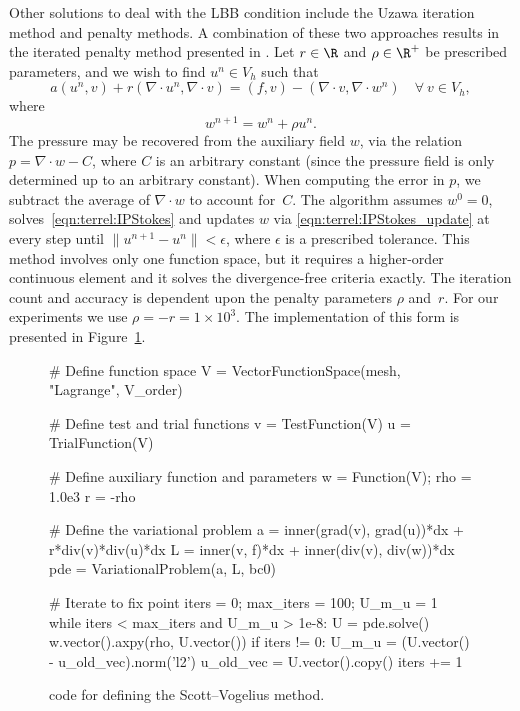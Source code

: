 Other solutions to deal with the LBB condition include the Uzawa
iteration method and penalty methods.  A combination of these two
approaches results in the iterated penalty method presented in
\citet{ScottVogelius1985}. Let $r \in \R$ and $\rho \in \R^{+}$ be
prescribed parameters, and we wish to find $u^n \in V_{h}$ such that
\begin{equation}
\label{eqn:terrel:IPStokes}
 a(u^n, v) + r(\nabla \cdot u^n, \nabla \cdot v)
      =  (f, v) - (\nabla\cdot v, \nabla \cdot w^n) \quad \forall \ v \in V_{h},
\end{equation}
%
where
%
\begin{equation}
\label{eqn:terrel:IPStokes_update}
   w^{n+1} = w^n + \rho u^n.
\end{equation}
%
The pressure may be recovered from the auxiliary field $w$, via
the relation $p = \nabla\cdot w - C$, where $C$ is an arbitrary
constant (since the pressure field is only determined up to an
arbitrary constant).  When computing the error in $p$, we subtract
the average of $\nabla \cdot w$ to account for~$C$. The algorithm
assumes $w^0 = 0$, solves~\eqref{eqn:terrel:IPStokes} and updates $w$
via \eqref{eqn:terrel:IPStokes_update} at every step until $\|u^{n+1} -
u^{n}\| < \epsilon$, where $\epsilon$ is a prescribed tolerance. This
method involves only one function space, but it requires a higher-order
continuous element and it solves the divergence-free criteria exactly.
The iteration count and accuracy is dependent upon the penalty
parameters $\rho$ and~$r$.  For our experiments we use $\rho = -r =
1 \times 10^{3}$.  The implementation of this form is presented in
Figure~\ref{code:terrel:var:ip}.
%
\begin{figure}
\begin{python}
# Define function space
V = VectorFunctionSpace(mesh, "Lagrange", V_order)

# Define test and trial functions
v = TestFunction(V)
u = TrialFunction(V)

# Define auxiliary function and parameters
w = Function(V);
rho = 1.0e3
r = -rho

# Define the variational problem
a = inner(grad(v), grad(u))*dx + r*div(v)*div(u)*dx
L = inner(v, f)*dx + inner(div(v), div(w))*dx
pde = VariationalProblem(a, L, bc0)

# Iterate to fix point
iters = 0; max_iters = 100; U_m_u = 1
while iters < max_iters and U_m_u > 1e-8:
    U = pde.solve()
    w.vector().axpy(rho, U.vector())
    if iters != 0:
        U_m_u = (U.vector() - u_old_vec).norm('l2')
    u_old_vec = U.vector().copy()
    iters += 1
\end{python}
\caption{\dolfin{} code for defining the Scott--Vogelius method.}
\label{code:terrel:var:ip}
\end{figure}

